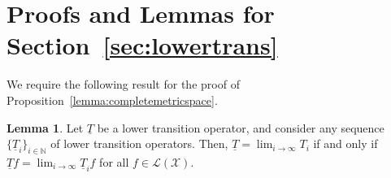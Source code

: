 \documentclass[10pt,a4paper]{paper}
\theoremstyle{definition}
\newtheorem{corollary}[theorem]{Corollary}
\newtheorem{lemma}[theorem]{Lemma}
\newcommand{\nats}{\mathbb{N}}
\newcommand{\reals}{\mathbb{R}}
\newcommand{\realsnonneg}{\reals_{\geq 0}}
\newcommand{\states}{\mathcal{X}}
\newcommand{\lt}{\underline{T}}
\newcommand{\gambles}{\mathcal{L}}
\newcommand{\gamblesX}{\gambles(\states)}
\newcommand{\rateset}{\mathcal{Q}}
\begin{document}



\section{Proofs and Lemmas for Section~\ref{sec:lowertrans}}

We require the following result for the proof of Proposition~\ref{lemma:completemetricspace}.
\begin{lemma}\cite[Proposition~1]{DeBock:2016}\label{lemma:lowertrans_limit_iff_pointwise_limit}
Let $\lt$ be a lower transition operator, and consider any sequence $\{\lt_i\}_{i\in\nats}$ of lower transition operators. Then, $\lt=\lim_{i\to\infty}T_i$ if and only if $\lt f=\lim_{i\to\infty}\lt_i f$ for all $f\in\gamblesX$.
\end{lemma}
\end{document}
